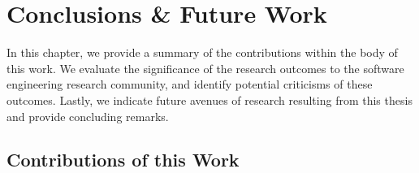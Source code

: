 \chapter{Conclusions \& Future Work}
\label{ch:conclusions}



In this chapter, we provide a summary of the contributions within the body of this work. We evaluate the significance of the research outcomes to the software engineering research community, and identify potential criticisms of these outcomes. Lastly, we indicate future avenues of research resulting from this thesis and provide concluding remarks.

\section{Contributions of this Work}

